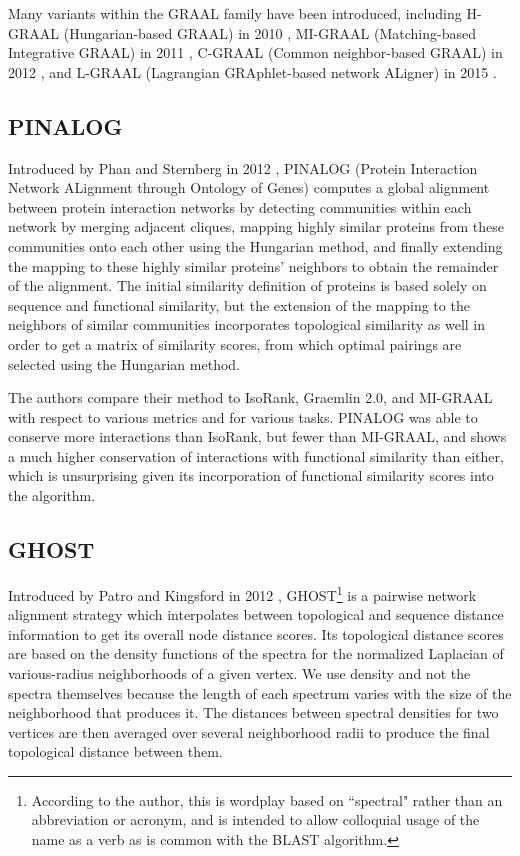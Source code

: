 \documentclass[12pt]{thesis}
\theoremstyle{plain}
\theoremstyle{definition}
\theoremstyle{remark}
\begin{document}
Many variants within the GRAAL family have been introduced, including H-GRAAL (Hungarian-based GRAAL) in 2010 \cite{milenkovic2010optimal}, MI-GRAAL (Matching-based Integrative GRAAL) in 2011 \cite{kuchaiev2011integrative}, C-GRAAL (Common neighbor-based GRAAL) in 2012 \cite{memivsevic2012c}, and L-GRAAL (Lagrangian GRAphlet-based network ALigner) in 2015 \cite{malod2015graal}.

\subsection{PINALOG}

Introduced by Phan and Sternberg in 2012 \cite{phan2012pinalog}, PINALOG (Protein Interaction Network ALignment through Ontology of Genes) computes a global alignment between protein interaction networks by detecting communities within each network by merging adjacent cliques, mapping highly similar proteins from these communities onto each other using the Hungarian method, and finally extending the mapping to these highly similar proteins' neighbors to obtain the remainder of the alignment. The initial similarity definition of proteins is based solely on sequence and functional similarity, but the extension of the mapping to the neighbors of similar communities incorporates topological similarity as well in order to get a matrix of similarity scores, from which optimal pairings are selected using the Hungarian method.

The authors compare their method to IsoRank, Graemlin 2.0, and MI-GRAAL with respect to various metrics and for various tasks. PINALOG was able to conserve more interactions than IsoRank, but fewer than MI-GRAAL, and shows a much higher conservation of interactions with functional similarity than either, which is unsurprising given its incorporation of functional similarity scores into the algorithm. 

\subsection{GHOST}

Introduced by Patro and Kingsford in 2012 \cite{Patro_2012}, GHOST\footnote{According to the author, this is wordplay based on ``spectral" rather than an abbreviation or acronym, and is intended to allow colloquial usage of the name as a verb as is common with the BLAST algorithm.}  is a pairwise network alignment strategy which interpolates between topological and sequence distance information to get its overall node distance scores. Its topological distance scores are based on the density functions of the spectra for the normalized Laplacian of various-radius neighborhoods of a given vertex. We use density and not the spectra themselves because the length of each spectrum varies with the size of the neighborhood that produces it. The distances between spectral densities for two vertices are then averaged over several neighborhood radii to produce the final topological distance between them.
\end{document}
